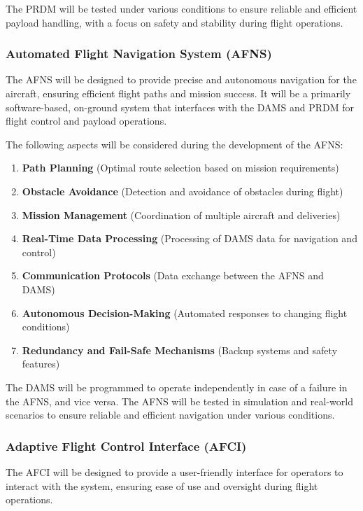 \documentclass[12pt]{article}
\begin{document}
The PRDM will be tested under various conditions to ensure reliable and efficient payload handling, with a focus on safety and stability during flight operations.

\subsubsection{Automated Flight Navigation System (AFNS)}
The AFNS will be designed to provide precise and autonomous navigation for the aircraft, ensuring efficient flight paths and mission success. It will be a primarily software-based, on-ground system that interfaces with the DAMS and PRDM for flight control and payload operations.

The following aspects will be considered during the development of the AFNS:
\begin{enumerate}
    \item \textbf{Path Planning} (Optimal route selection based on mission requirements)
    \item \textbf{Obstacle Avoidance} (Detection and avoidance of obstacles during flight)
    \item \textbf{Mission Management} (Coordination of multiple aircraft and deliveries)
    \item \textbf{Real-Time Data Processing} (Processing of DAMS data for navigation and control)
    \item \textbf{Communication Protocols} (Data exchange between the AFNS and DAMS)
    \item \textbf{Autonomous Decision-Making} (Automated responses to changing flight conditions)
    \item \textbf{Redundancy and Fail-Safe Mechanisms} (Backup systems and safety features)
\end{enumerate}

The DAMS will be programmed to operate independently in case of a failure in the AFNS, and vice versa. The AFNS will be tested in simulation and real-world scenarios to ensure reliable and efficient navigation under various conditions.

\subsubsection{Adaptive Flight Control Interface (AFCI)}
The AFCI will be designed to provide a user-friendly interface for operators to interact with the system, ensuring ease of use and oversight during flight operations.
\end{document}
